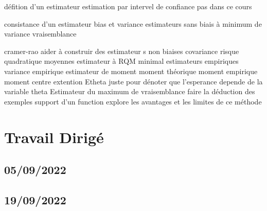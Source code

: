 \documentclass{article}
\begin{document}
défition d'un estimateur
estimation par intervel de confiance pas dans ce cours

consistance d'un estimateur
bias et variance
estimateurs sans biais à minimum de variance
vraisemblance

cramer-rao
aider à construir des estimateur s non biaises
covariance
risque quadratique moyennes
estimateur à RQM minimal
estimateurs empiriques
variance empirique
estimateur de moment
moment théorique
moment empirique
moment centre
extention
Etheta juste pour dénoter que l'esperance depende de la variable theta
Estimateur du maximum de vraisemblance
faire la déduction des exemples
support d'un function
explore les avantages et les limites de ce méthode


\section{Travail Dirigé}
\subsection{05/09/2022}
\subsection{19/09/2022}
\end{document}
